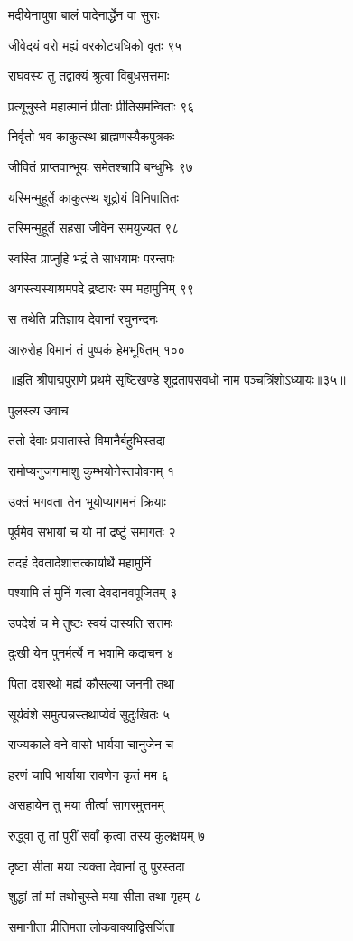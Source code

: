 मदीयेनायुषा बालं पादेनार्द्धेन वा सुराः

जीवेदयं वरो मह्यं वरकोट्यधिको वृतः ९५

राघवस्य तु तद्वाक्यं श्रुत्वा विबुधसत्तमाः

प्रत्यूचुस्ते महात्मानं प्रीताः प्रीतिसमन्विताः ९६

निर्वृतो भव काकुत्स्थ ब्राह्मणस्यैकपुत्रकः

जीवितं प्राप्तवान्भूयः समेतश्चापि बन्धुभिः ९७

यस्मिन्मुहूर्ते काकुत्स्थ शूद्रोयं विनिपातितः

तस्मिन्मुहूर्ते सहसा जीवेन समयुज्यत ९८

स्वस्ति प्राप्नुहि भद्रं ते साधयामः परन्तपः

अगस्त्यस्याश्रमपदे द्रष्टारः स्म महामुनिम् ९९

स तथेति प्रतिज्ञाय देवानां रघुनन्दनः

आरुरोह विमानं तं पुष्पकं हेमभूषितम् १०० 

॥इति श्रीपाद्मपुराणे प्रथमे सृष्टिखण्डे शूद्रतापसवधो नाम पञ्चत्रिंशोऽध्यायः॥३५॥


पुलस्त्य उवाच

ततो देवाः प्रयातास्ते विमानैर्बहुभिस्तदा

रामोप्यनुजगामाशु कुम्भयोनेस्तपोवनम् १

उक्तं भगवता तेन भूयोप्यागमनं क्रियाः

पूर्वमेव सभायां च यो मां द्रष्टुं समागतः २

तदहं देवतादेशात्तत्कार्यार्थे महामुनिं

पश्यामि तं मुनिं गत्वा देवदानवपूजितम् ३

उपदेशं च मे तुष्टः स्वयं दास्यति सत्तमः

दुःखी येन पुनर्मर्त्ये न भवामि कदाचन ४

पिता दशरथो मह्यं कौसल्या जननी तथा

सूर्यवंशे समुत्पन्नस्तथाप्येवं सुदुःखितः ५

राज्यकाले वने वासो भार्यया चानुजेन च

हरणं चापि भार्याया रावणेन कृतं मम ६

असहायेन तु मया तीर्त्वा सागरमुत्तमम्

रुद्ध्वा तु तां पुरीं सर्वां कृत्वा तस्य कुलक्षयम् ७

दृष्टा सीता मया त्यक्ता देवानां तु पुरस्तदा

शुद्धां तां मां तथोचुस्ते मया सीता तथा गृहम् ८

समानीता प्रीतिमता लोकवाक्याद्विसर्जिता

